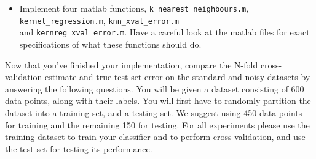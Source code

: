 \begin{itemize}
\item Implement four matlab functions,  {\tt k\_nearest\_neighbours.m},  {\tt kernel\_regression.m}, 
{\tt knn\_xval\_error.m} \\
and {\tt kernreg\_xval\_error.m}. 
Have a careful look at the matlab files for exact specifications of what these functions should do.

\end{itemize}
Now that you've finished your implementation, compare the N-fold
cross-validation estimate and true test set error on the standard and
noisy datasets by answering the following questions. You will be given a dataset consisting of 600 data points, along with their labels. You will first have to randomly partition the dataset into a training set, and a testing set. We suggest using 450 data points for training and the remaining 150 for testing. For all experiments please use the training dataset to train your classifier and to perform cross validation, and use the test set for testing its performance.

